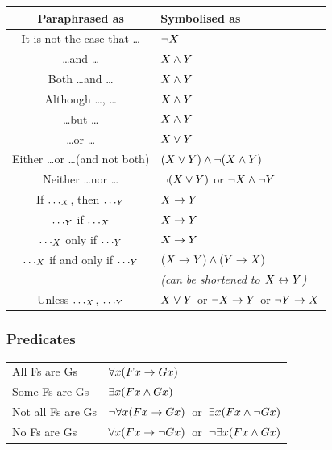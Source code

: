 \begin{tabular}{c|l}
	\textbf{Paraphrased as} & \textbf{Symbolised as}\\[.5em]
	\hline
	It is not the case that \ldots & $\neg X$\\[.4em]
	\ldots and \ldots & $X \mathbin{\wedge} Y$\\[.4em]
	Both \ldots and \ldots & $X \mathbin{\wedge} Y$\\[.4em]
	Although \ldots, \ldots & $X \mathbin{\wedge} Y$\\[.4em]
	\ldots but \ldots & $X \mathbin{\wedge} Y$\\[.4em]
	\ldots or \ldots & $X \vee Y$\\[.4em]
	Either \ldots or \ldots (and not both) & $(X \vee Y) \mathbin{\wedge} \neg(X \mathbin{\wedge} Y)$\\[.4em]
	Neither \ldots nor \ldots & $\neg(X \vee Y)$ or $\neg X \mathbin{\wedge} \neg Y$\\[.4em]
	If $\ldots_{X}$, then $\ldots_{Y}$ & $X \rightarrow Y$\\[.4em]
	$\ldots_{Y}$ if $\ldots_{X}$ & $X \rightarrow Y$\\[.4em]
	$\ldots_{X}$ only if $\ldots_{Y}$ & $X \rightarrow Y$\\[.4em]
	$\ldots_{X}$ if and only if $\ldots_{Y}$ & $(X \rightarrow Y)\mathbin{\wedge}(Y\rightarrow X)$ \\& \emph{(can be shortened to $X\leftrightarrow Y$)}\\[.4em]
	Unless $\ldots_{X}$, $\ldots_{Y}$ & $X \vee Y$ or $\neg X\rightarrow Y$ or $\neg Y\rightarrow X$\\
\end{tabular}

\subsubsection*{Predicates}
\begin{center}
\begin{tabular*}{\textwidth}{ll}
All Fs are Gs & $\forall x(Fx \rightarrow Gx)$\\
Some Fs are Gs & $\exists x(Fx \mathbin{\wedge} Gx)$\\
Not all Fs are Gs & $\neg\forall x(Fx \rightarrow Gx)$\ or\ $\exists x(Fx \mathbin{\wedge} \neg Gx)$\\
No Fs are Gs & $\forall x(Fx \rightarrow\neg Gx)$\ or\ $\neg\exists x(Fx \mathbin{\wedge} Gx)$\\
\end{tabular*}
\end{center}
